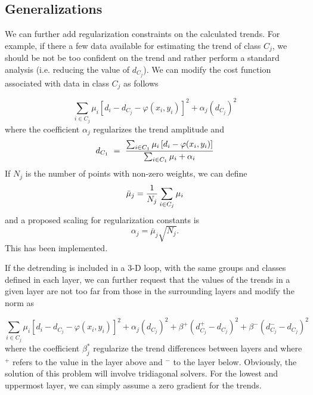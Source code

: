\subsection{Generalizations}

We can further add regularization constraints on the calculated trends. For example, if there a few data available for estimating the trend of class $C_j$, we
should be not be too confident on the trend and rather perform a standard analysis (i.e. reducing the value of $d_{C_j}$). We can modify the
cost function associated with data in class $C_j$ as follows

\begin{equation}
\sum_{i\in C_j} \mu_i \left[ d_i -d_{C_j}- \varphi(x_i,y_i) \right]^2 + \alpha_j (d_{C_j})^2
\end{equation}
where the coefficient $\alpha_j$ regularizes the trend amplitude and
\begin{equation}
d_{C_1} ~=~{ \sum_{i\in C_1} \mu_i \left[ d_i - \varphi(x_i,y_i) \right] \over \sum_{i\in C_1} \mu_i + \alpha_i}
\end{equation}
If $N_j$ is the number of points with non-zero weights, we can define
\begin{equation}
\bar{\mu}_j = {1 \over N_j} \sum_{i\in C_j} \mu_i
\end{equation}
and a proposed scaling for regularization constants is
\begin{equation}
\alpha_j = \bar{\mu}_j \sqrt{N_j}.
\end{equation}
This has been implemented.

If the detrending is included in a 3-D loop, with the same groups and classes defined in each layer, we can further request that the values of the trends in a given layer are not too far from those in the surrounding layers and modify the norm as

\begin{equation}
\sum_{i\in C_j} \mu_i \left[ d_i -d_{C_j}- \varphi(x_i,y_i) \right]^2 + \alpha_j (d_{C_j})^2 + \beta^+ (d^+_{C_j}- d_{C_j})^2 + \beta^- (d^-_{C_j}- d_{C_j})^2
\end{equation}
where the coefficient $\beta_j^*$ regularize the trend differences between layers and where $^+$ refers to the value in the layer above and $^-$ to the layer below. Obviously, the solution of this problem will involve tridiagonal solvers. For the lowest and uppermost layer, we can simply assume a zero gradient for the trends.

